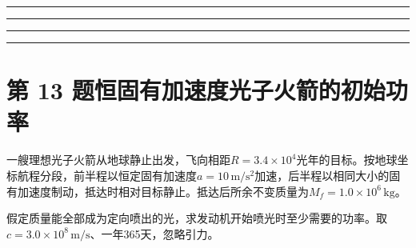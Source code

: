 \documentclass[UTF8,fontset=fandol,a4paper,11pt]{ctexart}
\newcommand{\workarea}{\par\vspace{7mm}\noindent{\small\color{muted}作答区}\par\vspace{4mm}
\noindent\textcolor{rulegray}{\rule{\linewidth}{0.3pt}}\par\vspace{16mm}
\noindent\textcolor{rulegray}{\rule{\linewidth}{0.3pt}}\par\vspace{16mm}
\noindent\textcolor{rulegray}{\rule{\linewidth}{0.3pt}}\par\vspace{16mm}
\noindent\textcolor{rulegray}{\rule{\linewidth}{0.3pt}}}
\begin{document}
\workarea

\clearpage


\section*{第 13 题\quad 恒固有加速度光子火箭的初始功率}\label{q:13}

一艘理想光子火箭从地球静止出发，飞向相距$R=3.4\times10^4$光年的目标。按地球坐标航程分段，前半程以恒定固有加速度$a=10\,\mathrm{m/s^2}$加速，后半程以相同大小的固有加速度制动，抵达时相对目标静止。抵达后所余不变质量为$M_f=1.0\times10^6\,\mathrm{kg}$。

假定质量能全部成为定向喷出的光，求发动机开始喷光时至少需要的功率。取$c=3.0\times10^8\,\mathrm{m/s}$、一年365天，忽略引力。
\end{document}
